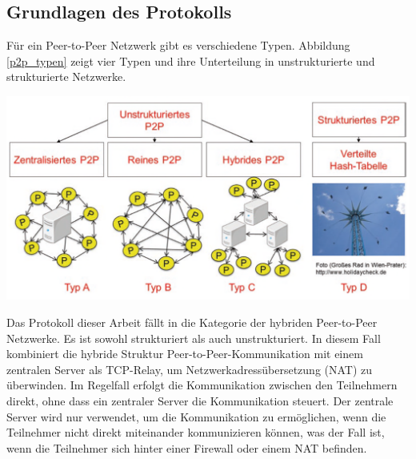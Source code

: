 \subsection{Grundlagen des Protokolls}

Für ein Peer-to-Peer Netzwerk gibt es verschiedene Typen. Abbildung \ref{p2p_typen} zeigt 
vier Typen und ihre Unterteilung in unstrukturierte und strukturierte Netzwerke.

\begin{center}
    \captionsetup{type=figure}
    \includegraphics[width=1\linewidth]{images/peer_to_peer_typen.png}
    \label{p2p_typen}
\end{center}

\noindent Das Protokoll dieser Arbeit fällt in die Kategorie der hybriden Peer-to-Peer Netzwerke.
Es ist sowohl strukturiert als auch unstrukturiert. In diesem Fall kombiniert die hybride Struktur 
Peer-to-Peer-Kommunikation mit einem zentralen Server als TCP-Relay, um Netzwerkadressübersetzung 
(NAT) zu überwinden. Im Regelfall erfolgt die Kommunikation zwischen den Teilnehmern direkt, ohne dass ein
zentraler Server die Kommunikation steuert. Der zentrale Server wird nur verwendet, um die
Kommunikation zu ermöglichen, wenn die Teilnehmer nicht direkt miteinander kommunizieren können, was 
der Fall ist, wenn die Teilnehmer sich hinter einer Firewall oder einem NAT befinden.
